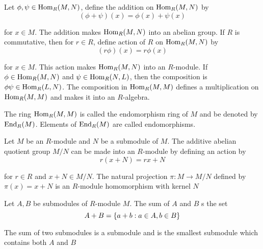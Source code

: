 \begin{proposition}
	Let $\phi, \psi \in \operatorname{Hom}_R(M, N)$, define the addition on $ \operatorname{Hom}_R(M, N)$ by
	$$
		(\phi + \psi)(x) = \phi(x) + \psi(x) 
	$$
	
	for $x \in M$. The addition makes $\operatorname{Hom}_R(M, N)$ into an abelian group. If $R$ is commutative, then for $r \in R$, define action of $R$ on $\operatorname{Hom}_R(M, N)$ by
	$$
		(r \phi)(x) = r \phi(x)
	$$
	
	for $x \in M$. This action makes $\operatorname{Hom}_R(M, N)$ into an $R$-module. If $\phi \in \operatorname{Hom}_R(M, N)$ and $\psi \in \operatorname{Hom}_R(N, L)$, then the composition is $\phi \psi \in \operatorname{Hom}_R(L, N)$. The composition in $\operatorname{Hom}_R(M, M)$ defines a multiplication on $\operatorname{Hom}_R(M, M)$ and makes it into an $R$-algebra.

\end{proposition}

\begin{definition}
	The ring $\operatorname{Hom}_R(M, M)$ is called the endomorphism ring of $M$ and be denoted by $\operatorname{End}_R(M)$. Elements of $\operatorname{End}_R(M)$ are called endomorphisms.
\end{definition}

\begin{proposition}
	Let $M$ be an $R$-module and $N$ be a submodule of $M$. The additive abelian quotient group $M/N$ can be made into an $R$-module by defining an action by
	$$
		r(x + N) = rx + N
	$$
	
	for $r \in R$ and $x + N \in M / N$. The natural projection $\pi: M \to M / N$ defined by $\pi(x) = x + N$ is an $R$-module homomorphism with kernel $N$
\end{proposition}

\begin{definition}
	Let $A, B$ be submodules of $R$-module $M$. The sum of $A$ and $B$ s the set
	$$
		A + B = \{a + b: a \in A, b \in B\}
	$$
	
	The sum of two submodules is a submodule and is the smallest submodule which contains both $A$ and $B$
\end{definition}

